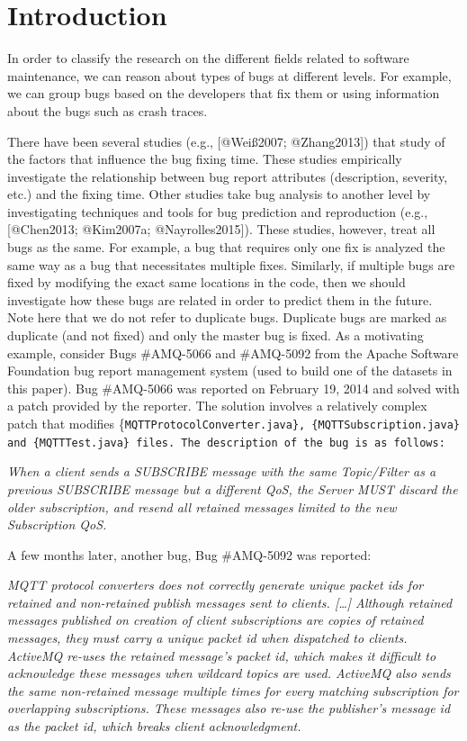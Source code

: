 \section{Introduction}\label{introduction}

In order to classify the research on the different fields related to
software maintenance, we can reason about types of bugs at different
levels. For example, we can group bugs based on the developers that fix
them or using information about the bugs such as crash traces.

There have been several studies (e.g., {[}@Weiß2007; @Zhang2013{]}) that
study of the factors that influence the bug fixing time. These studies
empirically investigate the relationship between bug report attributes
(description, severity, etc.) and the fixing time. Other studies take
bug analysis to another level by investigating techniques and tools for
bug prediction and reproduction (e.g., {[}@Chen2013; @Kim2007a;
@Nayrolles2015{]}). These studies, however, treat all bugs as the same.
For example, a bug that requires only one fix is analyzed the same way
as a bug that necessitates multiple fixes. Similarly, if multiple bugs
are fixed by modifying the exact same locations in the code, then we
should investigate how these bugs are related in order to predict them
in the future. Note here that we do not refer to duplicate bugs.
Duplicate bugs are marked as duplicate (and not fixed) and only the
master bug is fixed. As a motivating example, consider Bugs \#AMQ-5066
and \#AMQ-5092 from the Apache Software Foundation bug report management
system (used to build one of the datasets in this paper). Bug \#AMQ-5066
was reported on February 19, 2014 and solved with a patch provided by
the reporter. The solution involves a relatively complex patch that
modifies \{\tt MQTTProtocolConverter.java\},
\{\tt MQTTSubscription.java\} and \{\tt MQTTTest.java\} files. The
description of the bug is as follows:

\emph{When a client sends a SUBSCRIBE message with the same Topic/Filter
as a previous SUBSCRIBE message but a different QoS, the Server MUST
discard the older subscription, and resend all retained messages limited
to the new Subscription QoS.}

A few months later, another bug, Bug \#AMQ-5092 was reported:

\emph{MQTT protocol converters does not correctly generate unique packet
ids for retained and non-retained publish messages sent to clients.
{[}\ldots{}{]} Although retained messages published on creation of
client subscriptions are copies of retained messages, they must carry a
unique packet id when dispatched to clients. ActiveMQ re-uses the
retained message's packet id, which makes it difficult to acknowledge
these messages when wildcard topics are used. ActiveMQ also sends the
same non-retained message multiple times for every matching subscription
for overlapping subscriptions. These messages also re-use the
publisher's message id as the packet id, which breaks client
acknowledgment.}

